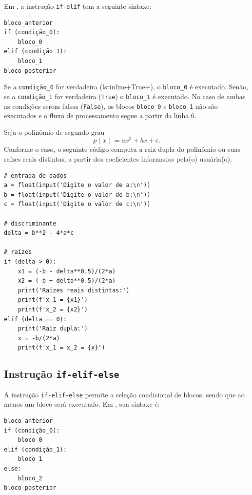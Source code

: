 Em {\python}, a instrução \lstinline+if-elif+ tem a seguinte sintaxe:

\begin{lstlisting}
bloco_anterior
if (condição_0):
    bloco_0
elif (condição 1):
    bloco_1
bloco posterior
\end{lstlisting}

Se a \lstinline+condição_0+ for verdadeira (lstinline+True+), o \lstinline+bloco_0+ é executado. Senão, se a \lstinline+condição_1+ for verdadeira (\lstinline+True+) o \lstinline+bloco_1+ é executado. No caso de ambas as condições serem falsas (\lstinline+False+), os blocos \lstinline+bloco_0+ e \lstinline+bloco_1+ não são executados e o fluxo de processamento segue a partir da linha 6.

\begin{ex}
  Seja o polinômio de segundo grau
  \begin{equation}
    p(x) = ax^2 + bx + c.
  \end{equation}
  Conforme o caso, o seguinte código computa a raiz dupla do polinômio ou suas raízes reais distintas, a partir dos coeficientes informados pela(o) usuária(o).

\begin{lstlisting}
# entrada de dados
a = float(input('Digite o valor de a:\n'))
b = float(input('Digite o valor de b:\n'))
c = float(input('Digite o valor de c:\n'))

# discriminante
delta = b**2 - 4*a*c

# raízes
if (delta > 0):
    x1 = (-b - delta**0.5)/(2*a)
    x2 = (-b + delta**0.5)/(2*a)
    print('Raízes reais distintas:')
    print(f'x_1 = {x1}')
    print(f'x_2 = {x2}')
elif (delta == 0):
    print('Raiz dupla:')
    x = -b/(2*a)
    print(f'x_1 = x_2 = {x}')
\end{lstlisting}

\end{ex}

\subsection{Instrução \texttt{if-elif-else}}

A instrução \lstinline+if-elif-else+ permite a seleção condicional de blocos, sendo que ao menos um bloco será executado. Em {\python}, sua sintaxe é:

\begin{lstlisting}
bloco_anterior
if (condição_0):
    bloco_0
elif (condição_1):
    bloco_1
else:
    bloco_2
bloco posterior
\end{lstlisting}

